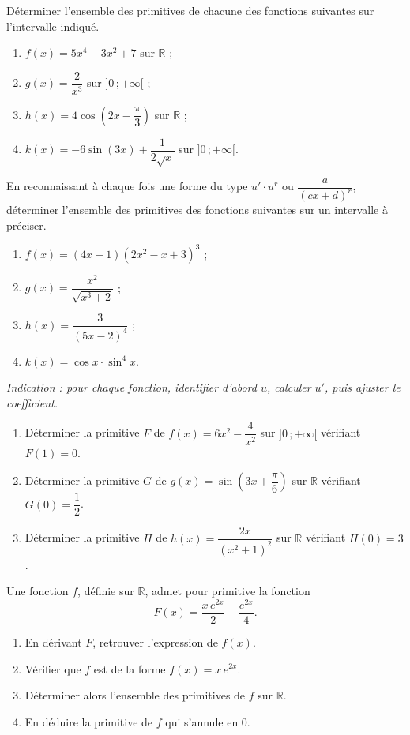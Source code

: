 \documentclass[11pt]{article}
\newcounter{popsec}
\newcounter{popsub}
\newcommand{\courssub}[1]{%
  \stepcounter{popsub}%
  \par\vspace{9pt}\noindent{\popxbold\fontsize{11.5}{13}\selectfont\color{popink}{\color{poporange}\thepopsec.\thepopsub}\hspace{6pt}#1}\par\nopagebreak\vspace{4pt}
}
\begin{document}
\begin{exercice}
Déterminer l'ensemble des primitives de chacune des fonctions suivantes sur l'intervalle indiqué.
\begin{enumerate}
\item $f(x) = 5x^4 - 3x^2 + 7$ sur $\mathbb{R}$ ;
\item $g(x) = \dfrac{2}{x^3}$ sur $]0\,;+\infty[$ ;
\item $h(x) = 4\cos\left(2x - \dfrac{\pi}{3}\right)$ sur $\mathbb{R}$ ;
\item $k(x) = -6\sin(3x) + \dfrac{1}{2\sqrt{x}}$ sur $]0\,;+\infty[$.
\end{enumerate}
\end{exercice}

\courssub{Je m'entraîne}

\begin{exercice}
En reconnaissant à chaque fois une forme du type $u' \cdot u^r$ ou $\dfrac{a}{(cx+d)^r}$, déterminer l'ensemble des primitives des fonctions suivantes sur un intervalle à préciser.
\begin{enumerate}
\item[a)] $f(x) = (4x-1)(2x^2 - x + 3)^3$ ;
\item[b)] $g(x) = \dfrac{x^2}{\sqrt{x^3 + 2}}$ ;
\item[c)] $h(x) = \dfrac{3}{(5x-2)^4}$ ;
\item[d)] $k(x) = \cos x \cdot \sin^4 x$.
\end{enumerate}
\emph{Indication : pour chaque fonction, identifier d'abord $u$, calculer $u'$, puis ajuster le coefficient.}
\end{exercice}

\begin{exercice}
\begin{enumerate}
\item Déterminer la primitive $F$ de $f(x) = 6x^2 - \dfrac{4}{x^2}$ sur $]0\,;+\infty[$ vérifiant $F(1) = 0$.
\item Déterminer la primitive $G$ de $g(x) = \sin\left(3x + \dfrac{\pi}{6}\right)$ sur $\mathbb{R}$ vérifiant $G(0) = \dfrac{1}{2}$.
\item Déterminer la primitive $H$ de $h(x) = \dfrac{2x}{(x^2+1)^2}$ sur $\mathbb{R}$ vérifiant $H(0) = 3$.
\end{enumerate}
\end{exercice}

\begin{exercice}
Une fonction $f$, définie sur $\mathbb{R}$, admet pour primitive la fonction
\[ F(x) = \dfrac{x\,e^{2x}}{2} - \dfrac{e^{2x}}{4}. \]
\begin{enumerate}
\item En dérivant $F$, retrouver l'expression de $f(x)$.
\item Vérifier que $f$ est de la forme $f(x) = x\,e^{2x}$.
\item Déterminer alors l'ensemble des primitives de $f$ sur $\mathbb{R}$.
\item En déduire la primitive de $f$ qui s'annule en $0$.
\end{enumerate}
\end{exercice}
\end{document}

